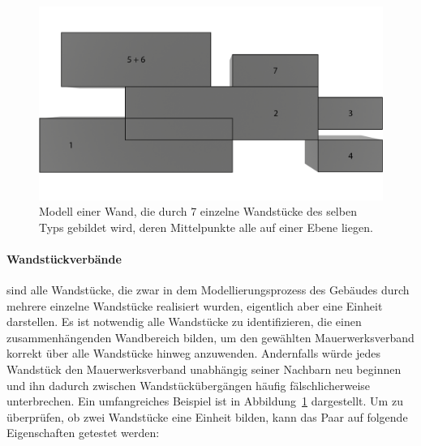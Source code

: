 \begin{figure}[ht]
    \centering
    \includegraphics[width=0.8\columnwidth]{fig/Real_Combination_Base_labeled.png}
    \caption{Modell einer Wand, die durch 7 einzelne Wandstücke des selben Typs gebildet wird, deren Mittelpunkte alle auf einer Ebene liegen.}
    \label{fig:concept:combination_example_base}
\end{figure}

\paragraph*{Wandstückverbände}\label{concept:combination_properties} sind alle Wandstücke,  die zwar in dem Modellierungsprozess des Gebäudes durch mehrere einzelne Wandstücke realisiert wurden, eigentlich aber eine Einheit darstellen. 
Es ist notwendig alle Wandstücke zu identifizieren, die einen zusammenhängenden Wandbereich bilden, um den gewählten Mauerwerksverband korrekt über alle Wandstücke hinweg anzuwenden.
Andernfalls würde jedes Wandstück den Mauerwerksverband unabhängig seiner Nachbarn neu beginnen und ihn dadurch zwischen Wandstückübergängen häufig fälschlicherweise unterbrechen.
Ein umfangreiches Beispiel ist in Abbildung~\ref*{fig:concept:combination_example_base} dargestellt.
Um zu überprüfen, ob zwei Wandstücke eine Einheit bilden, kann das Paar auf folgende Eigenschaften getestet werden:


